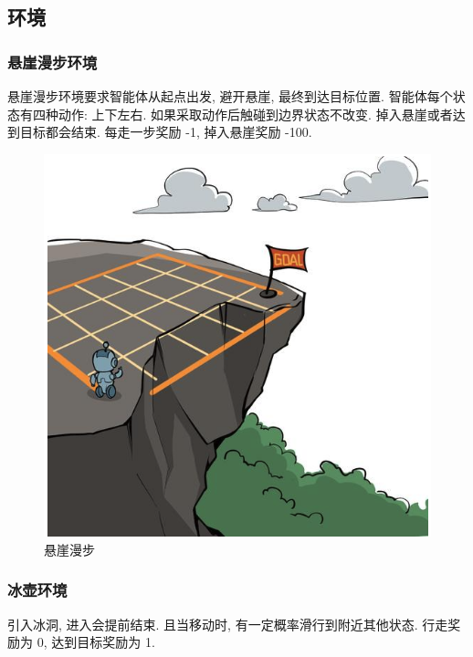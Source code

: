 \subsection{环境}

\subsubsection{悬崖漫步环境}
悬崖漫步环境要求智能体从起点出发, 避开悬崖, 最终到达目标位置. 智能体每个状态有四种动作: 上下左右. 如果采取动作后触碰到边界状态不改变. 掉入悬崖或者达到目标都会结束. 每走一步奖励 -1, 掉入悬崖奖励 -100.

\begin{figure}[!htb]
    \centering
    \includegraphics[width=0.618\linewidth]{pic/RL4/悬崖漫步.png}
    \caption{悬崖漫步}
\end{figure}

\subsubsection{冰壶环境}
引入冰洞, 进入会提前结束. 且当移动时, 有一定概率滑行到附近其他状态. 行走奖励为 0, 达到目标奖励为 1.




